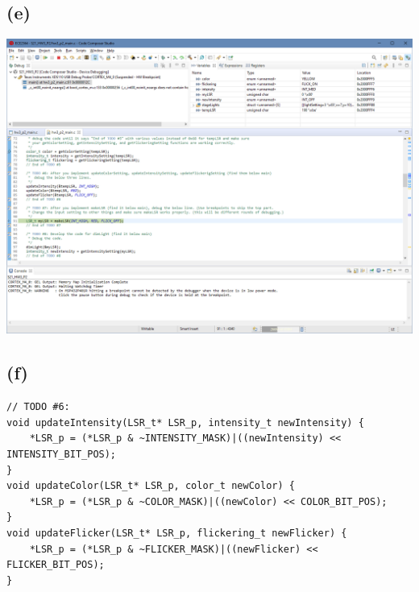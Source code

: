 \documentclass{article}
\begin{document}
\subsection*{(e)}
\begin{center}
    \includegraphics[width = \textwidth]{e.png}
\end{center}
\newpage
\subsection*{(f)}
\begin{center}
         \lstset{language=C}
        \lstset{frame=lines}
        \lstset{basicstyle=\footnotesize}
        \begin{lstlisting}
// TODO #6:
void updateIntensity(LSR_t* LSR_p, intensity_t newIntensity) {
    *LSR_p = (*LSR_p & ~INTENSITY_MASK)|((newIntensity) << INTENSITY_BIT_POS);
}
void updateColor(LSR_t* LSR_p, color_t newColor) {
    *LSR_p = (*LSR_p & ~COLOR_MASK)|((newColor) << COLOR_BIT_POS);
}
void updateFlicker(LSR_t* LSR_p, flickering_t newFlicker) {
    *LSR_p = (*LSR_p & ~FLICKER_MASK)|((newFlicker) << FLICKER_BIT_POS);
}
        \end{lstlisting}
\end{center}
\end{document}
